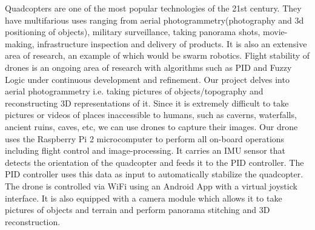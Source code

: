 Quadcopters are one of the most popular technologies of the 21st century. They have multifarious uses ranging from aerial photogrammetry(photography and 3d positioning of objects), military surveillance, taking panorama shots, movie-making, infrastructure inspection and delivery of products. It is also an extensive area of research, an example of which would be swarm robotics. Flight stability of drones is an ongoing area of research with algorithms such as PID and Fuzzy Logic under continuous development and refinement.  
\newline
\newline
Our project delves into aerial photogrammetry i.e. taking pictures of objects/topography and reconstructing 3D representations of it. Since it is extremely difficult to take pictures or videos of places inaccessible to humans, such as caverns, waterfalls, ancient ruins, caves, etc, we can use drones to capture their images.
\newline
Our drone uses the Raspberry Pi 2 microcomputer to perform all on-board operations including flight control and image-processing. It carries an IMU sensor that detects the orientation of the quadcopter and feeds it to the PID controller. The PID controller uses this data as input to automatically stabilize the quadcopter. 
\newline  
The drone is controlled via WiFi using an Android App with a virtual joystick interface. It is also equipped with a camera module which allows it to take pictures of objects and terrain and perform panorama stitching and 3D reconstruction.